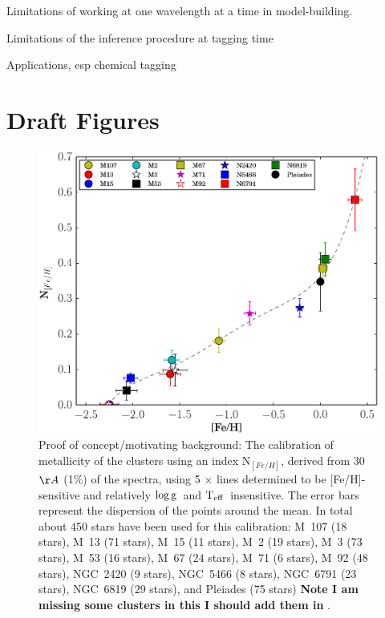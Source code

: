 \documentclass[12pt, preprint]{aastex}
\newcommand{\teff}{\mbox{$\rm T_{eff}$}}
\newcommand{\logg}{\mbox{$\rm \log g$}}
\begin{document}
Limitations of working at one wavelength at a time in model-building.

Limitations of the inference procedure at tagging time

Applications, esp chemical tagging

\section{Draft Figures}


\begin{figure}[h!]
  \includegraphics[width=\hsize]{./plots/metals_index.eps}
\caption{Proof of concept/motivating background: The calibration of metallicity of the clusters using an index N$_{[Fe/H]}$, derived from 30 $\AA$ (1\%) of the spectra, using 5 $\times$ lines determined to be [Fe/H]-sensitive and relatively \logg\ and \teff\ insensitive. The error bars represent the dispersion of the points
  around the mean. In total about 450  stars have been used for this
  calibration: M~107 (18 stars), M~13 (71 stars), M~15 (11 stars), M~2
  (19 stars), M~3 (73 stars), M~53 (16 stars), M~67 (24 stars), M~71
  (6 stars), M~92 (48 stars), NGC~2420 (9 stars), NGC~5466 (8 stars),
  NGC~6791 (23 stars), NGC~6819 (29 stars), and Pleiades (75 stars)  \textbf{Note I am missing some clusters in this I should add them in} .}
\label{fig:index}
\end{figure}
\end{document}
